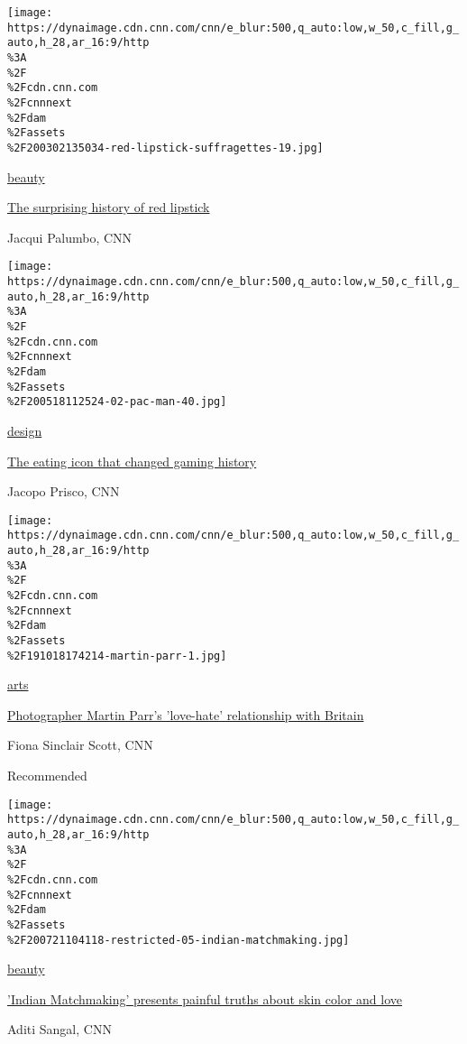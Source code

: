 \texttt{[image: https://dynaimage.cdn.cnn.com/cnn/e\_blur:500,q\_auto:low,w\_50,c\_fill,g\_auto,h\_28,ar\_16:9/http\\\%3A\\\%2F\\\%2Fcdn.cnn.com\\\%2Fcnnnext\\\%2Fdam\\\%2Fassets\\\%2F200302135034-red-lipstick-suffragettes-19.jpg]}

\href{/style/beauty}{beauty}

\href{/style/article/red-lipstick-history-beauty/index.html}{The
surprising history of red lipstick}

Jacqui Palumbo, CNN

\href{/style/article/pac-man-40-anniversary-history/index.html}{}

\texttt{[image: https://dynaimage.cdn.cnn.com/cnn/e\_blur:500,q\_auto:low,w\_50,c\_fill,g\_auto,h\_28,ar\_16:9/http\\\%3A\\\%2F\\\%2Fcdn.cnn.com\\\%2Fcnnnext\\\%2Fdam\\\%2Fassets\\\%2F200518112524-02-pac-man-40.jpg]}

\href{/style/design}{design}

\href{/style/article/pac-man-40-anniversary-history/index.html}{The
eating icon that changed gaming history}

Jacopo Prisco, CNN

\href{/style/article/martin-parr-bristol-interview/index.html}{}

\texttt{[image: https://dynaimage.cdn.cnn.com/cnn/e\_blur:500,q\_auto:low,w\_50,c\_fill,g\_auto,h\_28,ar\_16:9/http\\\%3A\\\%2F\\\%2Fcdn.cnn.com\\\%2Fcnnnext\\\%2Fdam\\\%2Fassets\\\%2F191018174214-martin-parr-1.jpg]}

\href{/style/arts}{arts}

\href{/style/article/martin-parr-bristol-interview/index.html}{Photographer
Martin Parr's 'love-hate' relationship with Britain}

Fiona Sinclair Scott, CNN

Recommended

\href{/style/article/indian-matchmaking-netflix-intl-hnk-beauty/index.html}{}

\texttt{[image: https://dynaimage.cdn.cnn.com/cnn/e\_blur:500,q\_auto:low,w\_50,c\_fill,g\_auto,h\_28,ar\_16:9/http\\\%3A\\\%2F\\\%2Fcdn.cnn.com\\\%2Fcnnnext\\\%2Fdam\\\%2Fassets\\\%2F200721104118-restricted-05-indian-matchmaking.jpg]}

\href{/style/beauty}{beauty}

\href{/style/article/indian-matchmaking-netflix-intl-hnk-beauty/index.html}{'Indian
Matchmaking' presents painful truths about skin color and love}

Aditi Sangal, CNN

\href{/style/article/china-three-gorges-dam-intl-hnk-dst/index.html}{}

